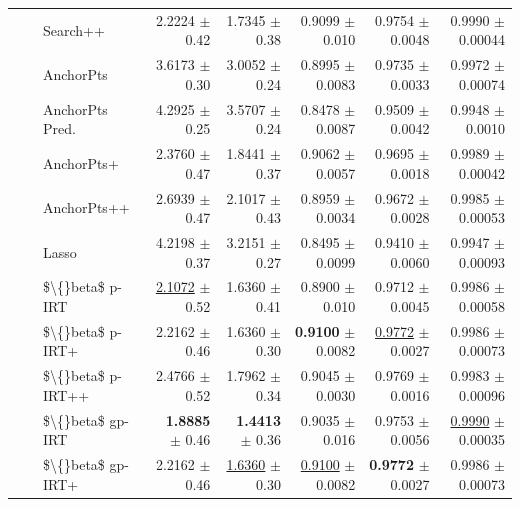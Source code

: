 \begin{longtable}{llp{}rrrrr}
 &  & Search++ & 2.2224 {\scriptsize $\pm$ 0.42} & 1.7345 {\scriptsize $\pm$ 0.38} & 0.9099 {\scriptsize $\pm$ 0.010} & 0.9754 {\scriptsize $\pm$ 0.0048} & 0.9990 {\scriptsize $\pm$ 0.00044} \\
 &  & AnchorPts & 3.6173 {\scriptsize $\pm$ 0.30} & 3.0052 {\scriptsize $\pm$ 0.24} & 0.8995 {\scriptsize $\pm$ 0.0083} & 0.9735 {\scriptsize $\pm$ 0.0033} & 0.9972 {\scriptsize $\pm$ 0.00074} \\
 &  & AnchorPts Pred. & 4.2925 {\scriptsize $\pm$ 0.25} & 3.5707 {\scriptsize $\pm$ 0.24} & 0.8478 {\scriptsize $\pm$ 0.0087} & 0.9509 {\scriptsize $\pm$ 0.0042} & 0.9948 {\scriptsize $\pm$ 0.0010} \\
 &  & AnchorPts+ & 2.3760 {\scriptsize $\pm$ 0.47} & 1.8441 {\scriptsize $\pm$ 0.37} & 0.9062 {\scriptsize $\pm$ 0.0057} & 0.9695 {\scriptsize $\pm$ 0.0018} & 0.9989 {\scriptsize $\pm$ 0.00042} \\
 &  & AnchorPts++ & 2.6939 {\scriptsize $\pm$ 0.47} & 2.1017 {\scriptsize $\pm$ 0.43} & 0.8959 {\scriptsize $\pm$ 0.0034} & 0.9672 {\scriptsize $\pm$ 0.0028} & 0.9985 {\scriptsize $\pm$ 0.00053} \\
 &  & Lasso & 4.2198 {\scriptsize $\pm$ 0.37} & 3.2151 {\scriptsize $\pm$ 0.27} & 0.8495 {\scriptsize $\pm$ 0.0099} & 0.9410 {\scriptsize $\pm$ 0.0060} & 0.9947 {\scriptsize $\pm$ 0.00093} \\
 &  & \$\textbackslash\{\}beta\$ p-IRT & \underline{2.1072} {\scriptsize $\pm$ 0.52} & 1.6360 {\scriptsize $\pm$ 0.41} & 0.8900 {\scriptsize $\pm$ 0.010} & 0.9712 {\scriptsize $\pm$ 0.0045} & 0.9986 {\scriptsize $\pm$ 0.00058} \\
 &  & \$\textbackslash\{\}beta\$ p-IRT+ & 2.2162 {\scriptsize $\pm$ 0.46} & 1.6360 {\scriptsize $\pm$ 0.30} & \textbf{0.9100} {\scriptsize $\pm$ 0.0082} & \underline{0.9772} {\scriptsize $\pm$ 0.0027} & 0.9986 {\scriptsize $\pm$ 0.00073} \\
 &  & \$\textbackslash\{\}beta\$ p-IRT++ & 2.4766 {\scriptsize $\pm$ 0.52} & 1.7962 {\scriptsize $\pm$ 0.34} & 0.9045 {\scriptsize $\pm$ 0.0030} & 0.9769 {\scriptsize $\pm$ 0.0016} & 0.9983 {\scriptsize $\pm$ 0.00096} \\
 &  & \$\textbackslash\{\}beta\$ gp-IRT & \textbf{1.8885} {\scriptsize $\pm$ 0.46} & \textbf{1.4413} {\scriptsize $\pm$ 0.36} & 0.9035 {\scriptsize $\pm$ 0.016} & 0.9753 {\scriptsize $\pm$ 0.0056} & \underline{0.9990} {\scriptsize $\pm$ 0.00035} \\
 &  & \$\textbackslash\{\}beta\$ gp-IRT+ & 2.2162 {\scriptsize $\pm$ 0.46} & \underline{1.6360} {\scriptsize $\pm$ 0.30} & \underline{0.9100} {\scriptsize $\pm$ 0.0082} & \textbf{0.9772} {\scriptsize $\pm$ 0.0027} & 0.9986 {\scriptsize $\pm$ 0.00073} \\

\end{longtable}
